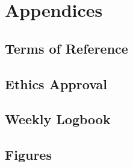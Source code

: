 \documentclass[11pt, twoside, a4paper]{report}
\newcommand*\cleartoleftpage{%
  \clearpage
  \ifodd\value{page}\hbox{}\newpage\fi
}
\begin{document}
\chapter{Appendices}

\section{Terms of Reference}


\section{Ethics Approval}\label{sec:ethics_approval}


\section{Weekly Logbook}
\raggedbottom{}

\flushbottom{}



\cleartoleftpage\section{Figures}




\todos{}

\end{document}
